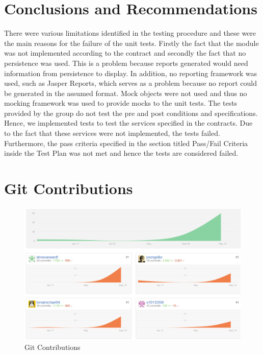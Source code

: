 \section{Conclusions and Recommendations}
\label{sec:conclusions}
There were various limitations identified in the testing procedure and these were the main reasons for the failure of the unit tests. Firstly the fact that the module was not implemented according to the contract and secondly the fact that no persistence was used. This is a problem because reports generated would need information from persistence to display. In addition, no reporting framework was used, such as Jasper Reports, which serves as a problem because no report could be generated in the assumed format. Mock objects were not used and thus no mocking framework was used to provide mocks to the unit tests. The tests provided by the group do not test the pre and post conditions and specifications. Hence, we implemented tests to test the services specified in the contracts. Due to the fact that these services were not implemented, the tests failed. Furthermore, the pass criteria specified in the section titled Pass/Fail Criteria inside the Test Plan was not met and hence the tests are considered failed. 

\newpage
\appendix
\section{Git Contributions}
\begin{figure}[h!]
	\includegraphics[scale=0.6]{./figures/gitGraph.PNG}
	\caption{Git Contributions}
\end{figure}

